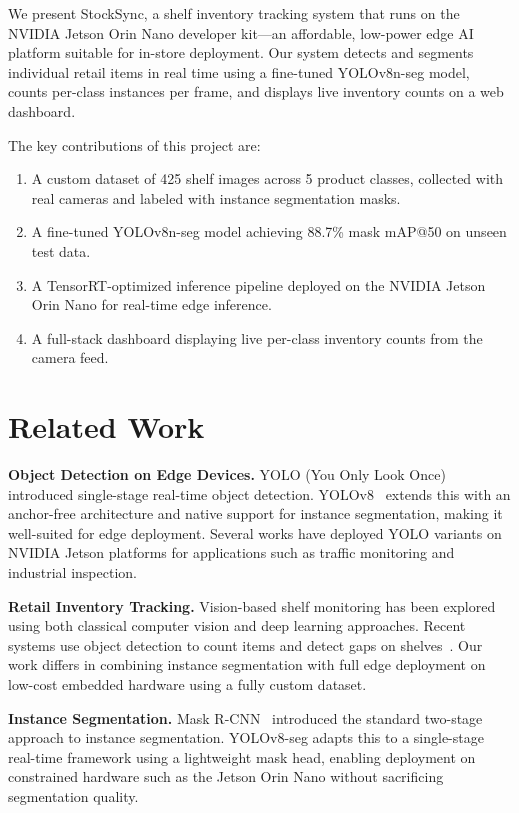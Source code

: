\documentclass[10pt,twocolumn,letterpaper]{article}
\begin{document}
We present StockSync, a shelf inventory tracking system that
runs on the NVIDIA Jetson Orin Nano developer kit---an
affordable, low-power edge AI platform suitable for
in-store deployment. Our system detects and segments
individual retail items in real time using a fine-tuned
YOLOv8n-seg model, counts per-class instances per frame, and
displays live inventory counts on a web dashboard.

The key contributions of this project are:
\begin{enumerate}
  \item A custom dataset of 425 shelf images across 5 product
        classes, collected with real cameras and labeled with
        instance segmentation masks.
  \item A fine-tuned YOLOv8n-seg model achieving 88.7\%
        mask mAP@50 on unseen test data.
  \item A TensorRT-optimized inference pipeline deployed on
        the NVIDIA Jetson Orin Nano for real-time edge
        inference.
  \item A full-stack dashboard displaying live per-class
        inventory counts from the camera feed.
\end{enumerate}

\section{Related Work}

\noindent\textbf{Object Detection on Edge Devices.}
YOLO (You Only Look Once)~\cite{redmon2016yolo} introduced
single-stage real-time object detection. YOLOv8~\cite{yolov8}
extends this with an anchor-free architecture and native
support for instance segmentation, making it well-suited for
edge deployment. Several works have deployed YOLO variants on
NVIDIA Jetson platforms for applications such as traffic
monitoring and industrial inspection.

\noindent\textbf{Retail Inventory Tracking.}
Vision-based shelf monitoring has been explored using both
classical computer vision and deep learning approaches.
Recent systems use object detection to count items and detect
gaps on shelves~\cite{goldman2019precise}. Our work differs
in combining instance segmentation with full edge deployment
on low-cost embedded hardware using a fully custom dataset.

\noindent\textbf{Instance Segmentation.}
Mask R-CNN~\cite{he2017mask} introduced the standard
two-stage approach to instance segmentation. YOLOv8-seg
adapts this to a single-stage real-time framework using a
lightweight mask head, enabling deployment on constrained
hardware such as the Jetson Orin Nano without sacrificing
segmentation quality.
\end{document}
